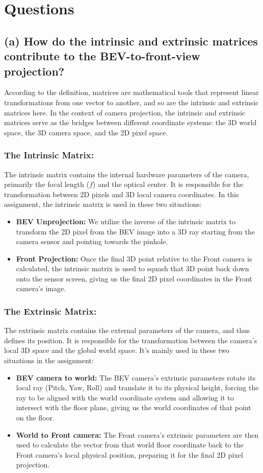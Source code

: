 \documentclass{article}
\begin{document}
\section{Questions}
\subsection{(a) How do the intrinsic and extrinsic matrices contribute to the BEV-to-front-view projection?}
According to the definition, matrices are mathematical tools that represent linear transformations from one 
vector to another, and so are the intrinsic and extrinsic matrices here. In the context of camera projection, 
the intrinsic and extrinsic matrices serve as the bridges between different coordinate systems: the 3D world space, 
the 3D camera space, and the 2D pixel space.

\subsubsection{The Intrinsic Matrix:}
The intrinsic matrix contains the internal hardware parameters of the camera, primarily the focal length ($f$) 
and the optical center. It is responsible for the transformation between 2D pixels and 3D local camera coordinates.
In this assignment, the intrinsic matrix is used in these two situations:
\begin{itemize}
    \item \textbf{BEV Unprojection:} We utilize the inverse of the intrinsic matrix to transform the 2D pixel from the BEV image into a 3D ray starting from the camera sensor and pointing towards the pinhole.
    \item \textbf{Front Projection:} Once the final 3D point relative to the Front camera is calculated, the intrinsic matrix is used to squash that 3D point back down onto the sensor screen, giving us the final 2D pixel coordinates in the Front camera's image.
\end{itemize}

\subsubsection{The Extrinsic Matrix:} 
The extrinsic matrix contains the external parameters of the camera, and thus defines its position. 
It is responsible for the transformation between the camera's local 3D space and the global world space.
It's mainly used in these two situations in the assignment:
\begin{itemize}
    \item \textbf{BEV camera to world:} The BEV camera's extrinsic parameters rotate its local ray (Pitch, Yaw, Roll) and translate it to its physical height, forcing the ray 
    to be aligned with the world coordinate system and allowing it to intersect with the floor plane, giving us the world coordinates of that point on the floor.
    \item \textbf{World to Front camera:} The Front camera's extrinsic parameters are then used to calculate the vector from that world floor coordinate back to the 
    Front camera's local physical position, preparing it for the final 2D pixel projection.
\end{itemize}
\end{document}
